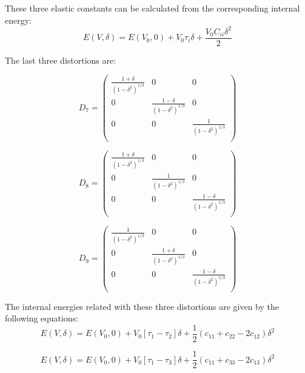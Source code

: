 \begin{appendices}
These three elastic constants can be calculated from the corresponding internal energy:
\begin{equation}
							E(V,\delta) = E(V_0,0) + V_0\tau_i \delta + \frac{V_0C_{ii}\delta^2}{2}
\end{equation}

The last three distortions are:

\begin{equation}\label{eq_D7}
						D_7 = \begin{pmatrix}
						\frac{1+\delta}{(1-\delta^2)^{1/3}} & 0 & 0 \\
						0 & \frac{1-\delta}{(1-\delta^2)^{1/3}} & 0 \\
						0 & 0 & \frac{1}{(1-\delta^2)^{1/3}} \\	
						\end{pmatrix}
\end{equation}			

\begin{equation}\label{eq_D8}
						D_8 =  \begin{pmatrix}
						\frac{1+\delta}{(1-\delta^2)^{1/3}} & 0 & 0 \\
						0 & \frac{1}{(1-\delta^2)^{1/3}} & 0 \\
						0 & 0 & \frac{1-\delta}{(1-\delta^2)^{1/3}} \\
						\end{pmatrix}
\end{equation}	

\begin{equation}\label{eq_D9}
						D_9 = \begin{pmatrix}
						\frac{1}{(1-\delta^2)^{1/3}} & 0 & 0 \\
						0 & \frac{1+\delta}{(1-\delta^2)^{1/3}} & 0 \\
						0 & 0 & \frac{1-\delta}{(1-\delta^2)^{1/3}} \\	
						\end{pmatrix}
\end{equation}

The internal energies related with these three distortions are given by the following equations:
\begin{equation}
E(V,\delta) = E(V_0, 0) + V_0\left [ \tau_1 - \tau_2 \right ] \delta + \frac{1}{2} \left(c_{11} + c_{22} -2c_{12}  \right)\delta^2
\end{equation}

\begin{equation}
E(V,\delta) = E(V_0, 0) + V_0\left [ \tau_1 - \tau_3 \right ] \delta + \frac{1}{2} \left(c_{11} + c_{33} -2c_{13}  \right)\delta^2
\end{equation}


\end{appendices}
